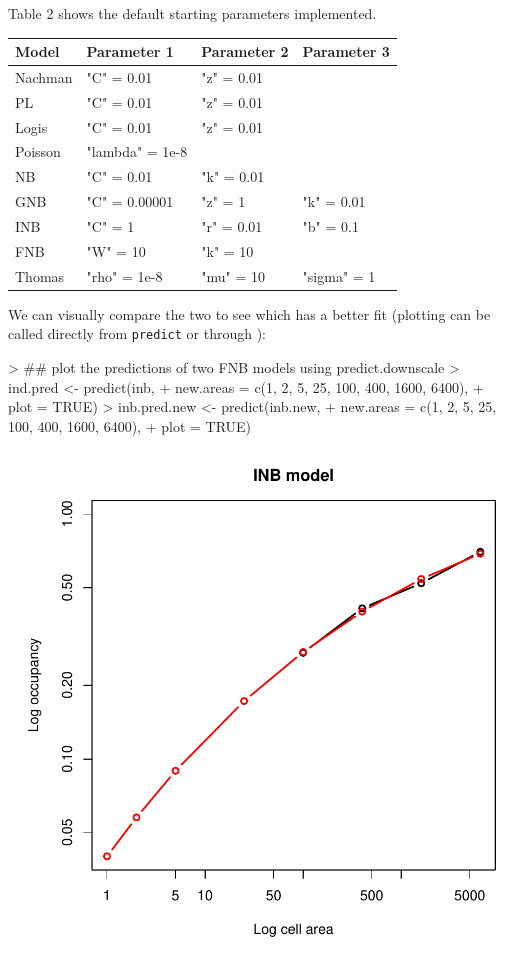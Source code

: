 \documentclass{article}[12pt, a4paper]
\begin{document}
Table 2 shows the default starting parameters implemented.

\begin{table}[!h]
\centering
\begin{tabular}{| l | l | l | l |}
\hline
\textbf{Model} & \textbf{Parameter 1} &	\textbf{Parameter 2} &	\textbf{Parameter 3} \\\hline
Nachman &	"C" = 0.01 &	"z" = 0.01 & \\	
PL &	"C" = 0.01 &	"z" = 0.01 & \\
Logis &	"C" = 0.01 &	"z" = 0.01 & \\	
Poisson &	"lambda" = 1e-8 &  &	\\
NB &	"C" = 0.01 &	"k" = 0.01 & \\	
GNB	& "C" = 0.00001 &	"z" = 1 &	"k" = 0.01 \\
INB	& "C" = 1 &	"r" = 0.01 &	"b" = 0.1 \\
FNB	& "W" = 10 &	"k" = 10 & \\	
Thomas &	"rho" = 1e-8 &	"mu" = 10 &	"sigma" = 1 \\\hline
\end{tabular}
\label{table:pars}
\end{table}

We can visually compare the two to see which has a better fit (plotting can be called directly from \texttt{predict} or through ):

\begin{Schunk}
\begin{Sinput}
> ## plot the predictions of two FNB models using predict.downscale
> ind.pred <- predict(inb,
+                     new.areas = c(1, 2, 5, 25, 100, 400, 1600, 6400),
+                     plot = TRUE)
> inb.pred.new <- predict(inb.new,
+                         new.areas = c(1, 2, 5, 25, 100, 400, 1600, 6400),
+                         plot = TRUE)
\end{Sinput}
\end{Schunk}
\includegraphics{Downscaling-downscale14}
\end{document}

